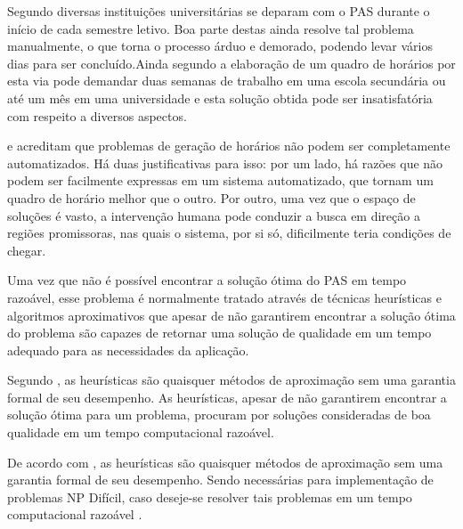 Segundo \cite{marinho2005heuristicas} diversas instituições universitárias se deparam com o PAS durante o início de cada semestre letivo. Boa parte destas ainda resolve tal problema manualmente, o que torna o processo árduo e demorado, podendo levar vários dias para ser concluído.Ainda segundo \cite{souza2000} a elaboração de um quadro de horários por esta via pode demandar duas semanas de trabalho em uma escola secundária ou até um mês em uma universidade e esta solução obtida pode ser insatisfatória com respeito a diversos aspectos.\par


\cite{schaerf1999survey} e \cite{de1985introduction} acreditam que problemas de geração de horários não podem ser completamente automatizados. Há duas justificativas para isso: por um lado, há razões que não podem ser facilmente expressas em um sistema automatizado, que tornam um quadro de horário melhor que o outro. Por outro, uma vez que o espaço de soluções é vasto, a intervenção humana pode conduzir a busca em direção a regiões promissoras, nas quais o sistema, por si só, dificilmente teria condições de chegar.\par

Uma vez que não é possível encontrar a solução ótima do PAS em tempo razoável, esse problema é normalmente tratado através de técnicas heurísticas e algoritmos aproximativos que apesar de não garantirem encontrar a solução ótima do problema são capazes de retornar uma solução de qualidade em um tempo adequado para as necessidades da aplicação.\par




Segundo \cite{steiglitz1982combinatorial}, as heurísticas são quaisquer métodos de 
aproximação sem uma garantia formal de seu desempenho. As heurísticas, apesar de não garantirem encontrar a solução ótima para um problema, procuram por soluções consideradas de boa qualidade em um tempo computacional razoável.\par

De acordo com \cite{steiglitz1982combinatorial}, as heurísticas são quaisquer métodos de aproximação sem uma garantia formal de seu desempenho. Sendo necessárias para implementação de problemas NP Difícil, caso deseje-se resolver tais problemas em um tempo computacional razoável \cite{evans1992optimization}.\par

